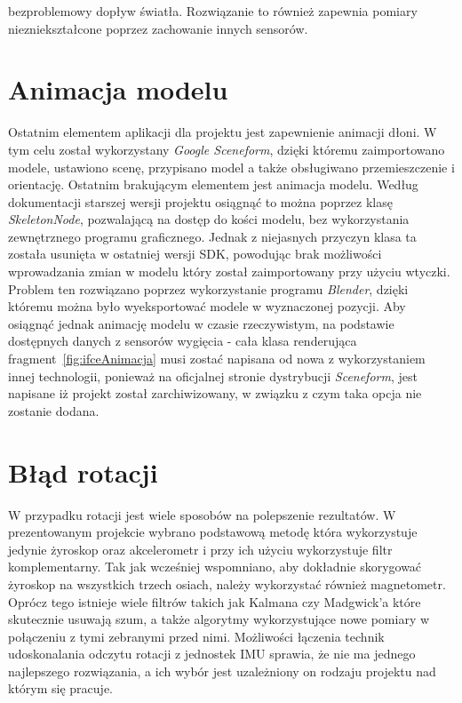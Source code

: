 bezproblemowy dopływ światła. Rozwiązanie to również zapewnia pomiary niezniekształcone poprzez zachowanie innych sensorów.
 
 
  \section{Animacja modelu}
 \label{sec:iuAnimacja}
 Ostatnim elementem aplikacji dla projektu jest zapewnienie animacji dłoni. W tym celu został wykorzystany \textit{Google Sceneform}, dzięki któremu zaimportowano modele, ustawiono scenę, przypisano model a także obsługiwano przemieszczenie i orientację. Ostatnim brakującym elementem jest animacja modelu. Według dokumentacji starszej wersji projektu osiągnąć to można poprzez klasę \textit{SkeletonNode}, pozwalającą na dostęp do kości modelu, bez wykorzystania zewnętrznego programu graficznego. Jednak z niejasnych przyczyn klasa ta została usunięta w ostatniej wersji SDK, powodując brak możliwości wprowadzania zmian w modelu który został zaimportowany przy użyciu wtyczki. Problem ten rozwiązano poprzez wykorzystanie programu \textit{Blender}, dzięki któremu można było wyeksportować modele w wyznaczonej pozycji. Aby osiągnąć jednak animację modelu w czasie rzeczywistym, na podstawie dostępnych danych z sensorów wygięcia - cała klasa renderująca fragment~\ref{fig:ifceAnimacja} musi zostać napisana od nowa z wykorzystaniem innej technologii, ponieważ na oficjalnej stronie dystrybucji \textit{Sceneform}, jest napisane iż projekt został zarchiwizowany, w związku z czym taka opcja nie zostanie dodana. 
 
  \section{Błąd rotacji}
 \label{sec:iuRotacja}
 W przypadku rotacji jest wiele sposobów na polepszenie rezultatów. W prezentowanym projekcie wybrano podstawową metodę która wykorzystuje jedynie żyroskop oraz akcelerometr i przy ich użyciu wykorzystuje filtr komplementarny. Tak jak wcześniej wspomniano, aby dokładnie skorygować żyroskop na wszystkich trzech osiach, należy wykorzystać również magnetometr. Oprócz tego istnieje wiele filtrów takich jak Kalmana czy Madgwick'a które skutecznie usuwają szum, a także algorytmy wykorzystujące nowe pomiary w połączeniu z tymi zebranymi przed nimi. Możliwości łączenia technik udoskonalania odczytu rotacji z jednostek IMU sprawia, że nie ma jednego najlepszego rozwiązania, a ich wybór jest uzależniony on rodzaju projektu nad którym się pracuje. 
 
